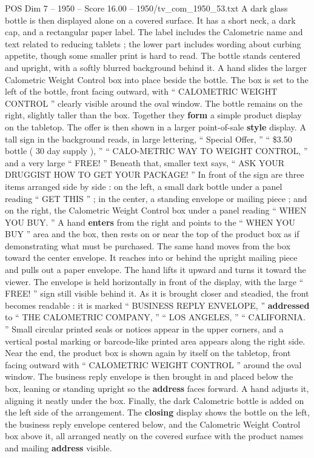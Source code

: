 \begin{textsample}{POS Dim 7 – 1950 – Score 16.00 – 1950/tv\_com\_1950\_53.txt}
A dark glass bottle is then displayed alone on a covered surface.
It has a short neck, a dark cap, and a rectangular paper label.
The label includes the Calometric name and text related to reducing tablets ; the lower part includes wording about curbing appetite, though some smaller print is hard to read.
The bottle stands centered and upright, with a softly blurred background behind it.
A hand slides the larger Calometric Weight Control box into place beside the bottle.
The box is set to the left of the bottle, front facing outward, with “ CALOMETRIC WEIGHT CONTROL ” clearly visible around the oval window.
The bottle remains on the right, slightly taller than the box.
Together they \textbf{form} a simple product display on the tabletop.
The offer is then shown in a larger point-of-sale \textbf{style} display.
A tall sign in the background reads, in large lettering, “ Special Offer, ” “ \$3.50 bottle ( 30 day supply ), ” “ CALO-METRIC WAY TO WEIGHT CONTROL, ” and a very large “ FREE! ” Beneath that, smaller text says, “ ASK YOUR DRUGGIST HOW TO GET YOUR PACKAGE! ” In front of the sign are three items arranged side by side : on the left, a small dark bottle under a panel reading “ GET THIS ” ; in the center, a standing envelope or mailing piece ; and on the right, the Calometric Weight Control box under a panel reading “ WHEN YOU BUY. ” A hand \textbf{enters} from the right and points to the “ WHEN YOU BUY ” area and the box, then rests on or near the top of the product box as if demonstrating what must be purchased.
The same hand moves from the box toward the center envelope.
It reaches into or behind the upright mailing piece and pulls out a paper envelope.
The hand lifts it upward and turns it toward the viewer.
The envelope is held horizontally in front of the display, with the large “ FREE! ” sign still visible behind it.
As it is brought closer and steadied, the front becomes readable : it is marked “ BUSINESS REPLY ENVELOPE, ” \textbf{addressed} to “ THE CALOMETRIC COMPANY, ” “ LOS ANGELES, ” “ CALIFORNIA. ” Small circular printed seals or notices appear in the upper corners, and a vertical postal marking or barcode-like printed area appears along the right side.
Near the end, the product box is shown again by itself on the tabletop, front facing outward with “ CALOMETRIC WEIGHT CONTROL ” around the oval window.
The business reply envelope is then brought in and placed below the box, leaning or standing upright so the \textbf{address} faces forward.
A hand adjusts it, aligning it neatly under the box.
Finally, the dark Calometric bottle is added on the left side of the arrangement.
The \textbf{closing} display shows the bottle on the left, the business reply envelope centered below, and the Calometric Weight Control box above it, all arranged neatly on the covered surface with the product names and mailing \textbf{address} visible.

\end{textsample}
